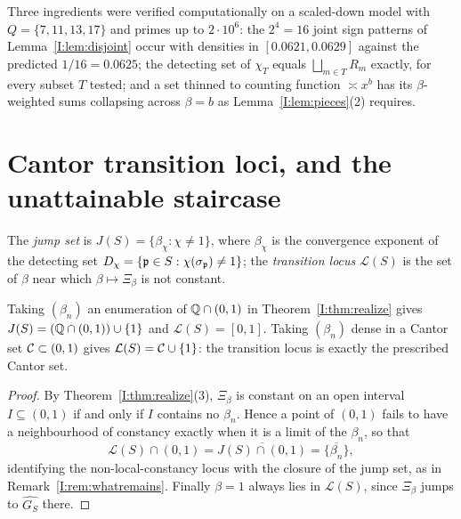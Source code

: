 \begin{remark}\label{I:rem:numcascade}
Three ingredients were verified computationally on a scaled-down model with
$Q=\{7,11,13,17\}$ and primes up to $2\cdot10^6$: the $2^4=16$ joint sign patterns of
Lemma~\ref{I:lem:disjoint} occur with densities in $[0.0621,0.0629]$ against the predicted
$1/16=0.0625$; the detecting set of $\chi_T$ equals $\bigsqcup_{m\in T}R_m$ exactly, for
every subset $T$ tested; and a set thinned to counting function $\asymp x^{b}$ has its
$\beta$-weighted sums collapsing across $\beta=b$ as Lemma~\ref{I:lem:pieces}(2) requires.
\end{remark}

\section{Cantor transition loci, and the unattainable staircase}\label{I:sec:cantor}

\begin{definition}\label{I:def:locus}
The \emph{jump set} is $J(S)=\{\beta_\chi:\chi\ne1\}$, where $\beta_\chi$ is the convergence
exponent of the detecting set $D_\chi=\{\mathfrak{p}\in S:\chi(\sigma_{\mathfrak{p}})\ne1\}$; the
\emph{transition locus} $\mathcal L(S)$ is the set of $\beta$ near which $\beta\mapsto\Xi_\beta$
is not constant.
\end{definition}

\begin{corollary}\label{I:cor:loci}
Taking $(\beta_n)$ an enumeration of $\mathbb{Q}\cap(0,1)$ in Theorem~\ref{I:thm:realize} gives
$J(S)=(\mathbb{Q}\cap(0,1))\cup\{1\}$ and $\mathcal L(S)=[0,1]$. Taking $(\beta_n)$ dense in a Cantor
set $\mathcal{C}\subset(0,1)$ gives $\mathcal L(S)=\mathcal{C}\cup\{1\}$: the transition locus is exactly the
prescribed Cantor set.
\end{corollary}

\begin{proof}
By Theorem~\ref{I:thm:realize}(3), $\Xi_\beta$ is constant on an open interval
$I\subseteq(0,1)$ if and only if $I$ contains no $\beta_n$. Hence a point of $(0,1)$ fails to
have a neighbourhood of constancy exactly when it is a limit of the $\beta_n$, so that
\[
\mathcal L(S)\cap(0,1)=\overline{J(S)\cap(0,1)}=\overline{\{\beta_n\}} ,
\]
identifying the non-local-constancy locus with the closure of the jump set, as in
Remark~\ref{I:rem:whatremains}. Finally $\beta=1$ always lies in $\mathcal L(S)$, since
$\Xi_\beta$ jumps to $\widehat{G_S}$ there.
\end{proof}

